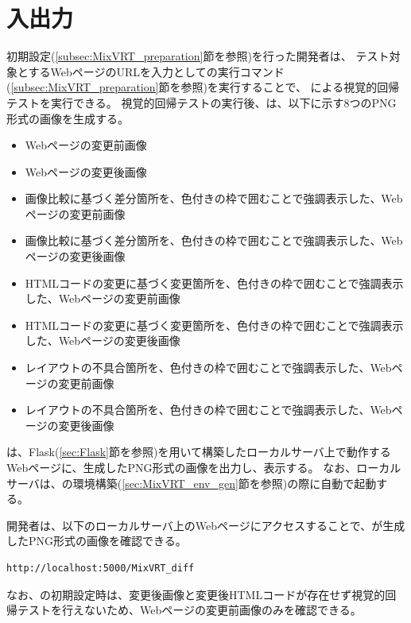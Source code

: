 \section{入出力}\label{subsec:MixVRT_IO}
初期設定(\ref{subsec:MixVRT_preparation}節を参照)を行った開発者は、
テスト対象とするWebページのURLを入力として\toolName の実行コマンド(\ref{subsec:MixVRT_preparation}節を参照)を実行することで、
\toolName による視覚的回帰テストを実行できる。
視覚的回帰テストの実行後、\toolName は、以下に示す8つのPNG形式の画像を生成する。
\begin{itemize}
      \item Webページの変更前画像
      \item Webページの変更後画像
      \item 画像比較に基づく差分箇所を、色付きの枠で囲むことで強調表示した、Webページの変更前画像
      \item 画像比較に基づく差分箇所を、色付きの枠で囲むことで強調表示した、Webページの変更後画像
      \item HTMLコードの変更に基づく変更箇所を、色付きの枠で囲むことで強調表示した、Webページの変更前画像
      \item HTMLコードの変更に基づく変更箇所を、色付きの枠で囲むことで強調表示した、Webページの変更後画像
      \item レイアウトの不具合箇所を、色付きの枠で囲むことで強調表示した、Webページの変更前画像
      \item レイアウトの不具合箇所を、色付きの枠で囲むことで強調表示した、Webページの変更後画像
\end{itemize}
\toolName は、Flask(\ref{sec:Flask}節を参照)を用いて構築したローカルサーバ上で動作するWebページに、生成したPNG形式の画像を出力し、表示する。
なお、ローカルサーバは、\toolName の環境構築(\ref{sec:MixVRT_env_gen}節を参照)の際に自動で起動する。
\par
開発者は、以下のローカルサーバ上のWebページにアクセスすることで、\toolName が生成したPNG形式の画像を確認できる。
\begin{lstlisting}[label=list:command3,frame=none,numbers=none,basicstyle={\normalsize \ttfamily \color[gray]{.15}}]
    http://localhost:5000/MixVRT_diff
   \end{lstlisting}
なお、\toolName の初期設定時は、変更後画像と変更後HTMLコードが存在せず視覚的回帰テストを行えないため、Webページの変更前画像のみを確認できる。





